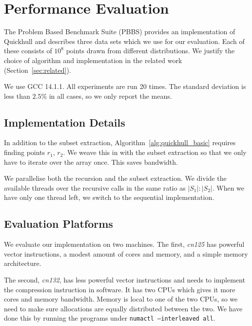 \section{Performance Evaluation}\label{sec:evaluation}

The Problem Based Benchmark Suite (PBBS) \cite{pbbs} provides an implementation
of Quickhull and describes three data sets which we use for
our evaluation. Each of these consists of $10^8$ points drawn from different
distributions. We justify the choice of algorithm and implementation in the
related work (Section~\ref{sec:related}).

We use GCC 14.1.1. All experiments are run 20 times. The standard deviation is 
less than $2.5\%$ in all cases, so we only report the means.

\subsection{Implementation Details}

In addition to the subset extraction, Algorithm~\ref{alg:quickhull_basic}
requires finding points $r_1$, $r_2$. We weave this in with the subset
extraction so that we only have to iterate over the array once. This saves
bandwidth.

We parallelise both the recursion and the subset extraction. We divide the
available threads over the recursive calls in the same ratio as
$|S_1| : |S_2|$. When we have only one thread left, we switch to the sequential
implementation.

\subsection{Evaluation Platforms}


We evaluate our implementation on two machines. The first, \textit{cn125}
has powerful vector instructions, a modest amount of cores and memory, and a 
simple memory architecture. 

The second, \textit{cn132}, has less powerful vector instructions and needs
to implement the compression instruction in software. It has two CPUs which
gives it more cores and memory bandwidth. Memory is local to one of the two
CPUs, so we need to make sure allocations are equally distributed between the
two. We have done this by running the programs under
\texttt{numactl --interleaved all}.


